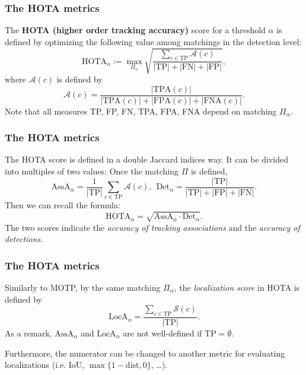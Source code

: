 \documentclass[slidetop, mathserif, dvipsnames]{beamer}
\begin{document}
\begin{frame}
	\frametitle{The HOTA metrics}
		
	The {\bf HOTA (higher order tracking accuracy)} score for a threshold $\alpha$ is defined by
	optimizing the following value among matchings in the detection level:
	\[
		\text{HOTA}_\alpha := 
		\max_{\Pi_\alpha} \sqrt{\dfrac{\sum_{c\in\text{TP}} \mathcal A(c) }{|\text{TP}|+|\text{FN}|+|\text{FP}|}},
	\]
	where $\mathcal A(c)$ is defined by
	\[
		\mathcal A(c) = \dfrac{|\text{TPA}(c)|}{|\text{TPA}(c)|+|\text{FPA}(c)|+|\text{FNA}(c)|}.
	\]
	Note that all measures TP, FP, FN, TPA, FPA, FNA depend on matching $\Pi_\alpha$.
		
\end{frame}

\begin{frame}
	\frametitle{The HOTA metrics}
	The HOTA score is defined in a double Jaccard indices way.
	It can be divided into multiples of two values:
	Once the matching $\Pi$ is defined,
	\[
		\text{AssA}_\alpha = \dfrac{1}{|\text{TP}|} \sum_{c\in\text{TP}} \mathcal A(c), \ \ 
		\text{Det}_\alpha = \dfrac{|\text{TP}|}{|\text{TP}| + |\text{FP}| + |\text{FN}|}.
	\]
	Then we can recall the formula:
	\[
		\text{HOTA}_\alpha = \sqrt{\text{AssA}_\alpha \cdot \text{Det}_\alpha}.
	\]
	The two scores indicate the {\color{olive}\emph{accuracy of tracking associations}}
	and the {\color{blue}\emph{accuracy of detections}}.
\end{frame}

\begin{frame}
	\frametitle{The HOTA metrics}
		
	Similarly to MOTP, by the same matching $\Pi_\alpha$,
	the \emph{\color{red} localization score} in HOTA is defined by
	\[
		\text{LocA}_\alpha = \dfrac{\sum_{c\in\text{TP}} \mathcal S(c)}{|\text{TP}|}.
	\]
	As a remark, $\text{AssA}_\alpha$ and $\text{LocA}_\alpha$ are not well-defined
	if $\text{TP} = \emptyset$.

	\quad

	Furthermore, the numerator can be changed to another metric for evaluating localizations
	(i.e. IoU, $\max\{1-\text{dist},0\}$, \ldots).
		
\end{frame}
\end{document}
